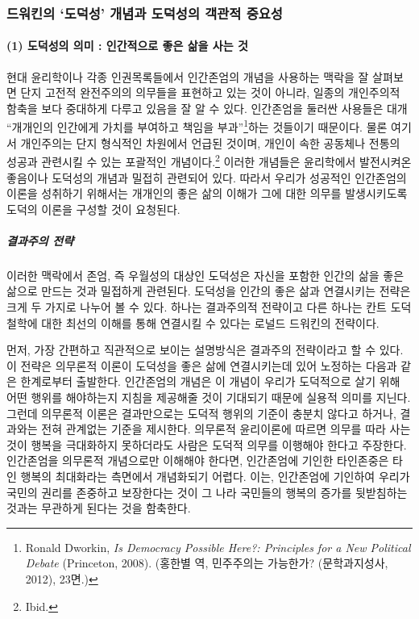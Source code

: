 \subsubsection{드워킨의 `도덕성' 개념과 도덕성의 객관적 중요성}

\paragraph{\texorpdfstring{(1) 도덕성의 의미 : 인간적으로 좋은 삶을 사는 것 }{(1) 도덕성의 의미 : 인간적으로 좋은 삶을 사는 것 }}

현대 윤리학이나 각종 인권목록들에서 인간존엄의 개념을 사용하는 맥락을 잘 살펴보면 단지 고전적 완전주의의 의무들을 표현하고 있는 것이 아니라, 일종의 개인주의적 함축을 보다 중대하게 다루고 있음을 잘 알 수 있다. 인간존엄을 둘러싼 사용들은 대개 ``개개인의 인간에게 가치를 부여하고 책임을 부과''\footnote{Ronald Dworkin, \emph{Is Democracy Possible Here?: Principles for a New Political Debate} (Princeton, 2008). (홍한별 역, 민주주의는 가능한가? (문학과지성사, 2012), 23면.)}하는 것들이기 때문이다. 물론 여기서 개인주의는 단지 형식적인 차원에서 언급된 것이며, 개인이 속한 공동체나 전통의 성공과 관련시킬 수 있는 포괄적인 개념이다.\footnote{Ibid.} 이러한 개념들은 윤리학에서 발전시켜온 좋음이나 도덕성의 개념과 밀접히 관련되어 있다. 따라서 우리가 성공적인 인간존엄의 이론을 성취하기 위해서는 개개인의 좋은 삶의 이해가 그에 대한 의무를 발생시키도록 도덕의 이론을 구성할 것이 요청된다.

\subparagraph{결과주의 전략}

이러한 맥락에서 존엄, 즉 우월성의 대상인 도덕성은 자신을 포함한 인간의 삶을 좋은 삶으로 만드는 것과 밀접하게 관련된다. 도덕성을 인간의 좋은 삶과 연결시키는 전략은 크게 두 가지로 나누어 볼 수 있다. 하나는 결과주의적 전략이고 다른 하나는 칸트 도덕철학에 대한 최선의 이해를 통해 연결시킬 수 있다는 로널드 드워킨의 전략이다.

먼저, 가장 간편하고 직관적으로 보이는 설명방식은 결과주의 전략이라고 할 수 있다. 이 전략은 의무론적 이론이 도덕성을 좋은 삶에 연결시키는데 있어 노정하는 다음과 같은 한계로부터 출발한다. 인간존엄의 개념은 이 개념이 우리가 도덕적으로 살기 위해 어떤 행위를 해야하는지 지침을 제공해줄 것이 기대되기 때문에 실용적 의미를 지닌다. 그런데 의무론적 이론은 결과만으로는 도덕적 행위의 기준이 충분치 않다고 하거나, 결과와는 전혀 관계없는 기준을 제시한다. 의무론적 윤리이론에 따르면 의무를 따라 사는 것이 행복을 극대화하지 못하더라도 사람은 도덕적 의무를 이행해야 한다고 주장한다. 인간존엄을 의무론적 개념으로만 이해해야 한다면, 인간존엄에 기인한 타인존중은 타인 행복의 최대화라는 측면에서 개념화되기 어렵다. 이는, 인간존엄에 기인하여 우리가 국민의 권리를 존중하고 보장한다는 것이 그 나라 국민들의 행복의 증가를 뒷받침하는 것과는 무관하게 된다는 것을 함축한다.

